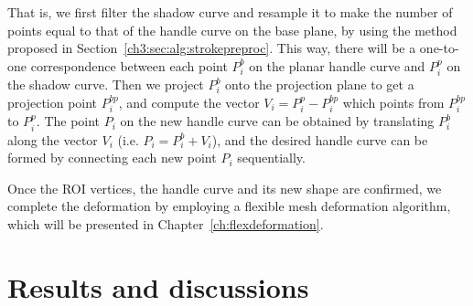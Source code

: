 That is, we first filter the shadow curve and resample it
to make the number of points equal to that of the handle
curve on the base plane, by using the method proposed in
Section~\ref{ch3:sec:alg:strokepreproc}. This way, there
will be a one-to-one correspondence between each point $P^b_i$
on the planar handle curve and $P^p_i$ on the shadow curve.
Then we project $P^b_i$ onto the projection plane to
get a projection point $P^{bp}_i$, and compute the
vector $V_i=P^p_i-P^{bp}_i$ which points from $P^{bp}_i$
to $P^p_i$. The point $P_i$ on the new handle curve
can be obtained by translating $P^b_i$ along the
vector $V_i$ (i.e. $P_i=P^b_i+V_i$), and the desired handle curve
can be formed by connecting each new point $P_i$ sequentially.



Once the ROI vertices, the handle curve and its new shape are
confirmed, we complete the deformation by employing a flexible mesh
deformation algorithm, which will be presented in
Chapter~\ref{ch:flexdeformation}.


\section{Results and discussions}
\label{ch3:sec:result}


